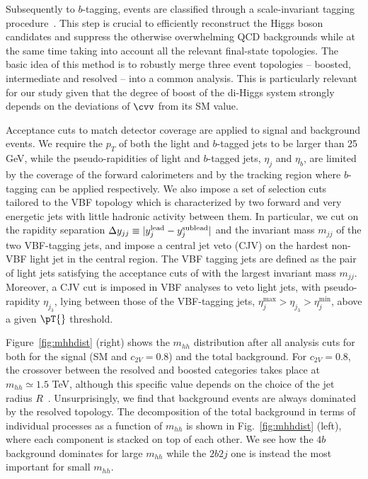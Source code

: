 Subsequently to $b$-tagging, events are
classified through a scale-invariant tagging procedure~\cite{Gouzevitch:2013qca,Behr:2015oqq}.
%
This step is crucial to efficiently reconstruct the Higgs boson candidates and
suppress the otherwise overwhelming QCD backgrounds while at the same time
taking into account all the relevant final-state topologies.
%
The basic idea of this method is to robustly merge three event
topologies -- { boosted, intermediate} and { resolved} --
into a common analysis.
%
This is
particularly relevant for our study given that
the degree of boost of the di-Higgs
system strongly depends
on the deviations of $\cvv$ from its SM value.

Acceptance cuts to match detector coverage are applied to signal and background events.
%
We require the $p_T$ of both the light and $b$-tagged jets
to be larger than 25 GeV, while 
the pseudo-rapidities of light
and $b$-tagged jets, $\eta_j$
and $\eta_b$, are limited
by the coverage of the forward calorimeters and
by the tracking region where $b$-tagging can be applied
respectively.
%
We also impose a set of selection cuts tailored
to the VBF topology which is characterized by two forward and very energetic
jets with little hadronic activity between them. In particular, we cut on the
rapidity separation $\Delta y_{jj}\equiv|y_j^{\rm lead}-y_j^{\rm sublead}|$ and
the invariant mass $m_{jj}$ of the two VBF-tagging jets, and impose a central
jet veto (CJV) on  the hardest non-VBF light jet in the central region. The VBF
tagging jets are defined as the pair of light jets satisfying the acceptance
cuts of with the largest invariant mass $m_{jj}$.
%
Moreover, a CJV cut  is imposed  in VBF analyses to veto light
jets, with pseudo-rapidity $\eta_{j_3}$, lying between those of the VBF-tagging
jets, $\eta_j^{\max}>\eta_{j_3}>\eta_j^{\min}$, above a given $\pT{}$ threshold.

Figure~\ref{fig:mhhdist} (right) shows the $m_{hh}$ distribution
after all analysis cuts for both
for the signal (SM and $c_{2V}=0.8$) and the total background.
%
For $c_{2V}=0.8$, the crossover between the resolved and
boosted categories takes place
at $m_{hh}\simeq 1.5$ TeV,
although this specific value depends on the choice of the jet
radius $R$~\cite{Gouzevitch:2013qca}.
%
Unsurprisingly, we find that
background events are always dominated by the resolved topology.
%
The decomposition of the total background in terms of individual processes as a
function of $m_{hh}$ is shown in Fig.~\ref{fig:mhhdist} (left),
where each component is
stacked on top of each other. We see how the $4b$ background dominates
for large $m_{hh}$ while the $2b2j$ one is instead the most important for small
$m_{hh}$. 

